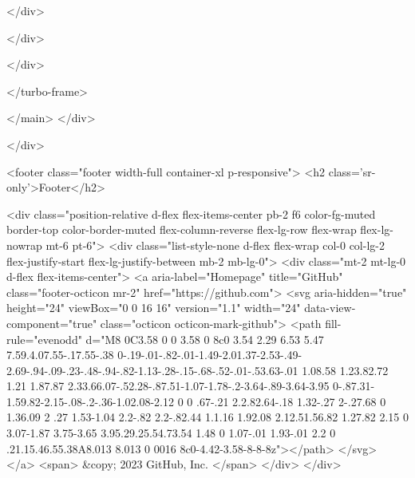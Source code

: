 </div>

  </div>


  </div>

  </turbo-frame>


    </main>
  </div>

  </div>

          <footer class="footer width-full container-xl p-responsive">
  <h2 class='sr-only'>Footer</h2>

  <div class="position-relative d-flex flex-items-center pb-2 f6 color-fg-muted border-top color-border-muted flex-column-reverse flex-lg-row flex-wrap flex-lg-nowrap mt-6 pt-6">
    <div class="list-style-none d-flex flex-wrap col-0 col-lg-2 flex-justify-start flex-lg-justify-between mb-2 mb-lg-0">
      <div class="mt-2 mt-lg-0 d-flex flex-items-center">
        <a aria-label="Homepage" title="GitHub" class="footer-octicon mr-2" href="https://github.com">
          <svg aria-hidden="true" height="24" viewBox="0 0 16 16" version="1.1" width="24" data-view-component="true" class="octicon octicon-mark-github">
    <path fill-rule="evenodd" d="M8 0C3.58 0 0 3.58 0 8c0 3.54 2.29 6.53 5.47 7.59.4.07.55-.17.55-.38 0-.19-.01-.82-.01-1.49-2.01.37-2.53-.49-2.69-.94-.09-.23-.48-.94-.82-1.13-.28-.15-.68-.52-.01-.53.63-.01 1.08.58 1.23.82.72 1.21 1.87.87 2.33.66.07-.52.28-.87.51-1.07-1.78-.2-3.64-.89-3.64-3.95 0-.87.31-1.59.82-2.15-.08-.2-.36-1.02.08-2.12 0 0 .67-.21 2.2.82.64-.18 1.32-.27 2-.27.68 0 1.36.09 2 .27 1.53-1.04 2.2-.82 2.2-.82.44 1.1.16 1.92.08 2.12.51.56.82 1.27.82 2.15 0 3.07-1.87 3.75-3.65 3.95.29.25.54.73.54 1.48 0 1.07-.01 1.93-.01 2.2 0 .21.15.46.55.38A8.013 8.013 0 0016 8c0-4.42-3.58-8-8-8z"></path>
</svg>
</a>        <span>
        &copy; 2023 GitHub, Inc.
        </span>
      </div>
    </div>

